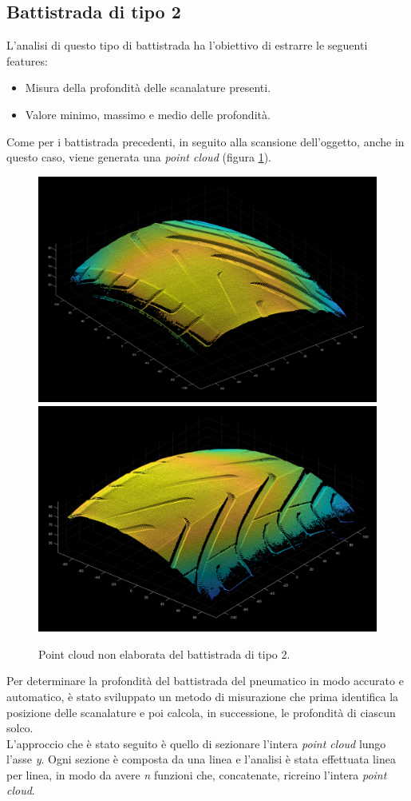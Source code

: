 \subsection{Battistrada di tipo 2}
L'analisi di questo tipo di battistrada ha l'obiettivo di estrarre le seguenti features:
\begin{itemize}
	\item Misura della profondità delle scanalature presenti.
	\item Valore minimo, massimo e medio delle profondità.
\end{itemize}

\noindent Come per i battistrada precedenti, in seguito alla scansione dell'oggetto, anche in questo caso, viene generata una \textit{point cloud} (figura \ref{fig:batt_2_analisi_1}).\\

\begin{figure}[H]
	\centering
	\includegraphics[width=0.45\columnwidth]{./pictures/batt_2_analisi_1.png}
	\includegraphics[width=0.45\columnwidth]{./pictures/batt_2_analisi_2.png}
	\caption{Point cloud non elaborata del battistrada di tipo 2.}\label{fig:batt_2_analisi_1}
\end{figure}

\noindent Per determinare la profondità del battistrada del pneumatico in modo accurato e automatico, è stato sviluppato un metodo di misurazione che prima identifica la posizione delle scanalature e poi calcola, in successione, le profondità di ciascun solco.\\
\newline
L'approccio che è stato seguito è quello di sezionare l'intera \textit{point cloud} lungo l'asse \textit{y}. Ogni sezione è composta da una linea e l'analisi è stata effettuata linea per linea, in modo da avere \textit{n} funzioni che, concatenate, ricreino l'intera \textit{point cloud}.\\

